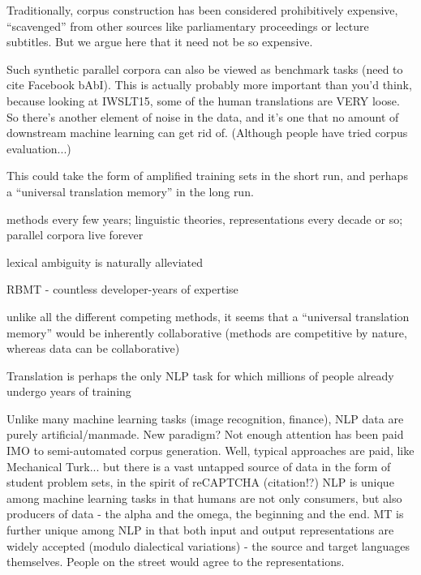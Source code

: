 Traditionally, corpus construction has been considered prohibitively expensive, ``scavenged'' from other sources like parliamentary proceedings or lecture subtitles.
But we argue here that it need not be so expensive.

Such synthetic parallel corpora can also be viewed as benchmark tasks (need to cite Facebook bAbI).
This is actually probably more important than you'd think, because looking at IWSLT15, some of the human translations are VERY loose.
So there's another element of noise in the data, and it's one that no amount of downstream machine learning can get rid of.
(Although people have tried corpus evaluation...)





This could take the form of amplified training sets in the short run, and perhaps a ``universal translation memory'' in the long run.

methods every few years; linguistic theories, representations every decade or so; parallel corpora live forever

lexical ambiguity is naturally alleviated

RBMT - countless developer-years of expertise

unlike all the different competing methods, it seems that a ``universal translation memory'' would be inherently collaborative (methods are competitive by nature, whereas data can be collaborative)





Translation is perhaps the only NLP task for which millions of people already undergo years of training


Unlike many machine learning tasks (image recognition, finance), NLP data are purely artificial/manmade.  New paradigm?  Not enough attention has been paid IMO to semi-automated corpus generation.  Well, typical approaches are paid, like Mechanical Turk... but there is a vast untapped source of data in the form of student problem sets, in the spirit of reCAPTCHA (citation!?)
NLP is unique among machine learning tasks in that humans are not only consumers, but also producers of data - the alpha and the omega, the beginning and the end.
MT is further unique among NLP in that both input and output representations are widely accepted (modulo dialectical variations) - the source and target languages themselves.
People on the street would agree to the representations.



